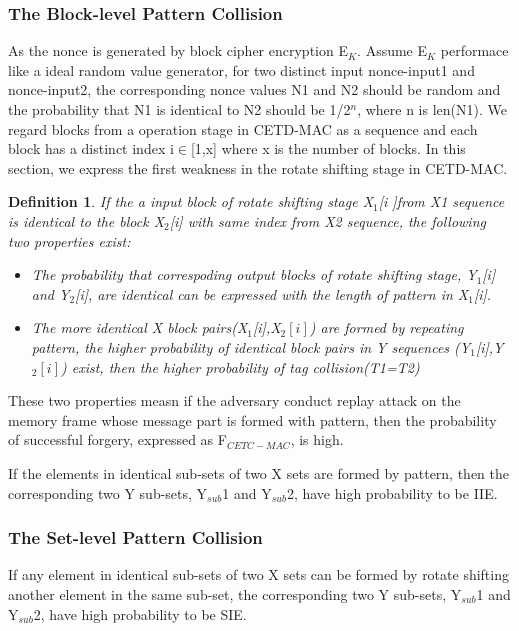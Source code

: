 \documentclass{article}
\newtheorem{defination}{Definition}[section]
\begin{document}
\subsubsection{The Block-level Pattern Collision}
As the nonce is generated by block cipher encryption E$_K$. Assume E$_K$ performace like a ideal random value generator, for two distinct input nonce-input1 and nonce-input2, the corresponding nonce values N1 and N2 should be random and the probability that N1 is identical to N2 should be 1/2$^n$, where n is len(N1). 
We regard blocks from a operation stage in CETD-MAC as a sequence and each block has a distinct index i$\in$[1,x] where x is the number of blocks. 
In this section, we express the first weakness in the rotate shifting stage in CETD-MAC. 
\begin{defination}
If the a input block of rotate shifting stage X$_1$[i ]from X1 sequence is identical to the block X$_2$[i] with same index from X2 sequence, the following two properties exist:
\begin{itemize}
	\item The probability that correspoding output blocks of rotate shifting stage, Y$_1$[i] and Y$_2$[i], are identical can be expressed with the length of pattern in X$_1$[i].	
	\item The more identical X block pairs(X$_1$[i],X$_2[i]$) are formed by repeating pattern, the higher probability of identical block pairs in Y sequences (Y$_1$[i],Y$_2[i]$) exist, then the higher probability of tag collision(T1=T2)
\end{itemize}
\end{defination}
These two properties measn if the adversary conduct replay attack on the memory frame whose message part is formed with pattern, then the probability of successful forgery, expressed as F$_{CETC-MAC}$, is high.

If the elements in identical sub-sets of two X sets are formed by pattern, then the corresponding two Y sub-sets, Y$_{sub}$1 and Y$_{sub}$2, have high probability to be IIE.

\subsubsection{The Set-level Pattern Collision}


If any element in identical sub-sets of two X sets can be formed by rotate shifting another element in the same sub-set, the corresponding two Y sub-sets, Y$_{sub}$1 and Y$_{sub}$2, have high probability to be SIE.
\end{document}
